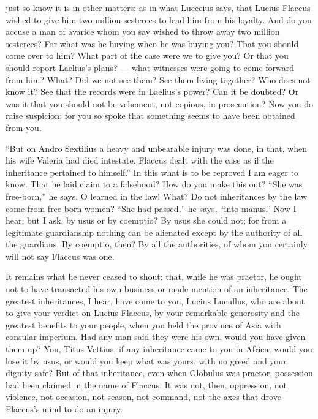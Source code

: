  just so know it is in other matters: as in what Lucceius says, that Lucius Flaccus wished to give him two million sesterces to lead him from his loyalty. And do you accuse a man of avarice whom you say wished to throw away two million sesterces? For what was he buying when he was buying you? That you should come over to him? What part of the case were we to give you? Or that you should report Laelius's plans? --- what witnesses were going to come forward from him? What? Did we not see them? See them living together? Who does not know it? See that the records were in Laelius's power? Can it be doubted? Or was it that you should not be vehement, not copious, in prosecution? Now you do raise suspicion; for you so spoke that something seems to have been obtained from you.

 ``But on Andro Sextilius a heavy and unbearable injury was done, in that, when his wife Valeria had died intestate, Flaccus dealt with the case as if the inheritance pertained to himself.'' In this what is to be reproved I am eager to know. That he laid claim to a falsehood? How do you make this out? ``She was free-born,'' he says. O learned in the law! What? Do not inheritances by the law come from free-born women? ``She had passed,'' he says, ``into manus.'' Now I hear; but I ask, by usus or by coemptio? By usus she could not; for from a legitimate guardianship nothing can be alienated except by the authority of all the guardians. By coemptio, then? By all the authorities, of whom you certainly will not say Flaccus was one.

 It remains what he never ceased to shout: that, while he was praetor, he ought not to have transacted his own business or made mention of an inheritance. The greatest inheritances, I hear, have come to you, Lucius Lucullus, who are about to give your verdict on Lucius Flaccus, by your remarkable generosity and the greatest benefits to your people, when you held the province of Asia with consular imperium. Had any man said they were his own, would you have given them up? You, Titus Vettius, if any inheritance came to you in Africa, would you lose it by usus, or would you keep what was yours, with no greed and your dignity safe? But of that inheritance, even when Globulus was praetor, possession had been claimed in the name of Flaccus. It was not, then, oppression, not violence, not occasion, not season, not command, not the axes that drove Flaccus's mind to do an injury.

